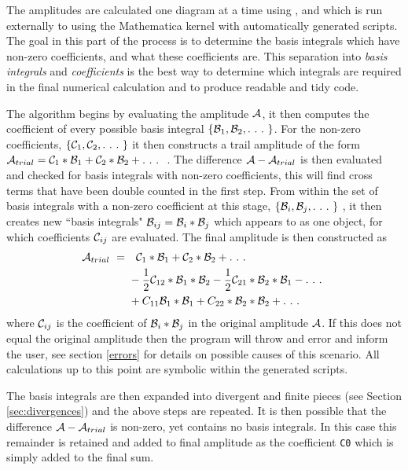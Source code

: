 The amplitudes are calculated one diagram at a time using \feynartss, \feyncalc and \tarcer which is run externally to \CC using the Mathematica kernel with automatically generated scripts.  The goal in this part of the process is to determine the basis integrals which have non-zero coefficients, and what these coefficients are.  This separation into \textit{basis integrals} and \textit{coefficients} is the best way to determine which integrals are required in the final numerical calculation and to produce readable and tidy code.

The algorithm begins by evaluating the amplitude $\mathcal{A}$, it then computes the coefficient of every possible basis integral $\{\B_1,\B_2,.\ .\ .\ \}$.  For the non-zero coefficients, $\{\mathcal{C}_1,\mathcal{C}_2, .\ .\ .\  \}$ it then constructs a trail amplitude of the form $\A_{trial} = \C_1 * \B_1 + \C_2 * \B_2 + .\ .\ .\ $ . The difference $\mathcal{A} - \mathcal{A}_{trial}$ is then evaluated and checked for basis integrals with non-zero coefficients, this will find cross terms that have been double counted in the first step.  From within the set of basis integrals with a non-zero coefficient at this stage, $\{\mathcal{B}_i,\mathcal{B}_j,.\ .\ .\ \}$ , it then creates new ``basis integrals" $\mathcal{B}_{ij} =  \mathcal{B}_i*\mathcal{B}_j$ which appears to \mathematica as one object, for which coefficients $\mathcal{C}_{ij}$ are evaluated.  The final amplitude is then constructed as
\begin{align*}
 \A_{trial}\ = \ & \ \ \C_1 * \B_1 + \C_2 * \B_2 + .\ .\ .\ \\ 
  &-\frac{1}{2} \C_{12} * \B_1*\B_2  -\frac{1}{2} \C_{21} * \B_2*\B_1 - .\ .\ .\ \\
  & + C_{11} \B_1*\B_1 + C_{22}*\B_2*\B_2 + .\ .\ .\ 
\end{align*}
where $ \mathcal{C}_{ij}$ is the coefficient of  $\mathcal{B}_i*\mathcal{B}_j$ in the original amplitude $\mathcal{A}$.  If this does not equal the original amplitude then the program will throw and error and inform the user, see section \ref{errors} for details on possible causes of this scenario.  All calculations up to this point are symbolic within the generated \mathematica scripts.

The basis integrals are then expanded into divergent and finite pieces (see Section \ref{sec:divergences}) and the above steps are repeated.  It is then possible that the difference $\mathcal{A} - \mathcal{A}_{trial}$ is non-zero, yet contains no basis integrals.  In this case this remainder is retained and added to final amplitude as the coefficient \lstinline{C0} which is simply added to the final sum.

